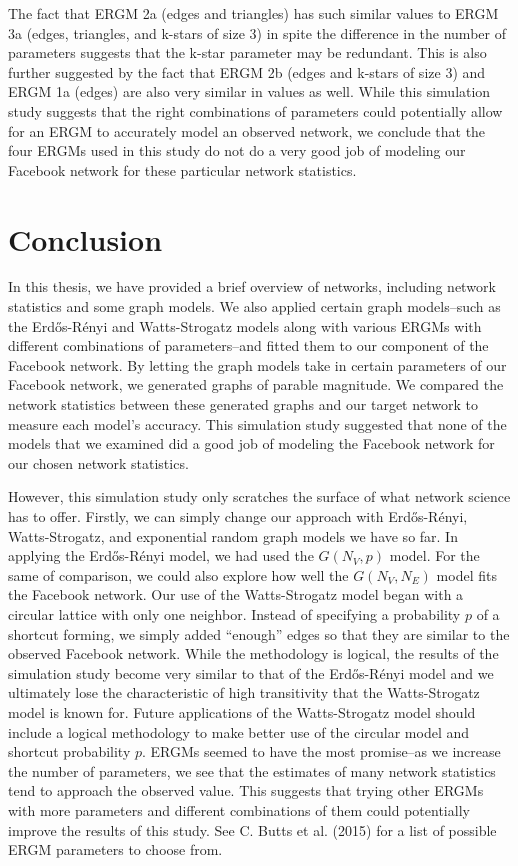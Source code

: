 \documentclass[12pt,twoside]{amherstthesis}
\begin{document}
  The fact that ERGM 2a (edges and triangles) has such similar values to
  ERGM 3a (edges, triangles, and k-stars of size \(3\)) in spite the
  difference in the number of parameters suggests that the k-star
  parameter may be redundant. This is also further suggested by the fact
  that ERGM 2b (edges and k-stars of size \(3\)) and ERGM 1a (edges) are
  also very similar in values as well. While this simulation study
  suggests that the right combinations of parameters could potentially
  allow for an ERGM to accurately model an observed network, we conclude
  that the four ERGMs used in this study do not do a very good job of
  modeling our Facebook network for these particular network statistics.
  
  \chapter{Conclusion}\label{conclusion}
  
  In this thesis, we have provided a brief overview of networks, including
  network statistics and some graph models. We also applied certain graph
  models--such as the Erdős-Rényi and Watts-Strogatz models along with
  various ERGMs with different combinations of parameters--and fitted them
  to our component of the Facebook network. By letting the graph models
  take in certain parameters of our Facebook network, we generated graphs
  of parable magnitude. We compared the network statistics between these
  generated graphs and our target network to measure each model's
  accuracy. This simulation study suggested that none of the models that
  we examined did a good job of modeling the Facebook network for our
  chosen network statistics.
  
  However, this simulation study only scratches the surface of what
  network science has to offer. Firstly, we can simply change our approach
  with Erdős-Rényi, Watts-Strogatz, and exponential random graph models we
  have so far. In applying the Erdős-Rényi model, we had used the
  \(G(N_{V}, p)\) model. For the same of comparison, we could also explore
  how well the \(G(N_{V}, N_{E})\) model fits the Facebook network. Our
  use of the Watts-Strogatz model began with a circular lattice with only
  one neighbor. Instead of specifying a probability \(p\) of a shortcut
  forming, we simply added ``enough'' edges so that they are similar to
  the observed Facebook network. While the methodology is logical, the
  results of the simulation study become very similar to that of the
  Erdős-Rényi model and we ultimately lose the characteristic of high
  transitivity that the Watts-Strogatz model is known for. Future
  applications of the Watts-Strogatz model should include a logical
  methodology to make better use of the circular model and shortcut
  probability \(p\). ERGMs seemed to have the most promise--as we increase
  the number of parameters, we see that the estimates of many network
  statistics tend to approach the observed value. This suggests that
  trying other ERGMs with more parameters and different combinations of
  them could potentially improve the results of this study. See C. Butts
  et al. (2015) for a list of possible ERGM parameters to choose from.
  
\end{document}

